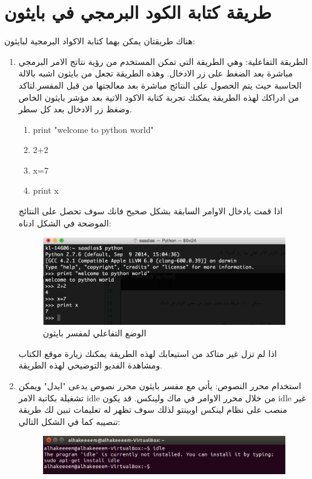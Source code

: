 \section{طريقة كتابة الكود البرمجي في بايثون}
هناك طريقتان يمكن بهما كتابة الاكواد البرمجية لبايثون:
\begin{enumerate}
\item
الطريقة التفاعلية:
وهي الطريقة التي تمكن المستخدم من رؤية نتاتج الامر البرمجي مباشرة بعد الضغط على زر الادخال. وهذه الطريقة تجعل من بايثون اشبه بالالة الحاسبة حيث يتم الحصول على النتائج مباشرة بعد معالجتها من قبل المفسر.لتاكد من ادراكك لهذه الطريقة يمكنك تجربة كتابة الاكود الاتية بعد مؤشر بايثون الخاص وضغظ زر الادخال بعد كل سطر.
\begin{enumerate}
\item

print "welcome to python world"
\item
2+2
\item
x=7
\item
print x
\end{enumerate}
اذا قمت بادخال الاوامر السابقة بشكل صحيح فانك سوف تحصل على النتائج الموضحة في الشكل ادناه:
\begin{figure}[H]
  \includegraphics[width=\linewidth]{figures/interactive.png}
  \caption{الوضع التفاعلي لمفسر بايثون}
  \label{fig:startpython2}
\end{figure}
اذا لم تزل غير متاكد من استيعابك لهذه الطريقة يمكنك زيارة موقع الكتاب ومشاهدة الفديو التوضيحي لهذه الطريقة.
\item
استخدام محرر النصوص:
يأتي مع مفسر بايثون محرر نصوص يدعى "ايدل" ويمكن تشغيلة بكاتبة الامر idle من خلال محرر الاوامر في ماك ولينكس. قد يكون idle غير منصب على نظام لينكس اوبينتو لذلك سوف تظهر له تعليمات تبين لك طريقة تنصيبه كما في الشكل التالي:
\begin{figure}[H]
  \includegraphics[width=\linewidth]{figures/installidle.png}

\end{figure}
\end{enumerate}
